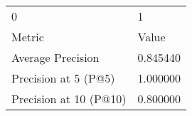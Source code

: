 \begin{tabular}{ll}
0 & 1 \\
Metric & Value \\
Average Precision & 0.845440 \\
Precision at 5 (P@5) & 1.000000 \\
Precision at 10 (P@10) & 0.800000 \\
\end{tabular}
